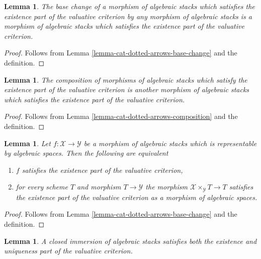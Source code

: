 \documentclass{stacks-project}
\theoremstyle{plain}
\newtheorem{lemma}[subsection]{Lemma}
\theoremstyle{definition}
\theoremstyle{remark}
\numberwithin{equation}{subsection}
\begin{document}
\begin{lemma}
\label{lemma-base-change-existence}
The base change of a morphism of algebraic stacks which satisfies the
existence part of the valuative criterion by any morphism of
algebraic stacks is a morphism of algebraic stacks which satisfies the
existence part of the valuative criterion.
\end{lemma}

\begin{proof}
Follows from Lemma \ref{lemma-cat-dotted-arrows-base-change}
and the definition.
\end{proof}

\begin{lemma}
\label{lemma-composition-existence}
The composition of morphisms of algebraic stacks which satisfy the
existence part of the valuative criterion is another
morphism of algebraic stacks which satisfies the
existence part of the valuative criterion.
\end{lemma}

\begin{proof}
Follows from Lemma \ref{lemma-cat-dotted-arrows-composition}
and the definition.
\end{proof}

\begin{lemma}
\label{lemma-existence-representable}
Let $f : \mathcal{X} \to \mathcal{Y}$ be a morphism of algebraic stacks
which is representable by algebraic spaces. Then the following are equivalent
\begin{enumerate}
\item $f$ satisfies the existence part of the valuative criterion,
\item for every scheme $T$ and morphism $T \to \mathcal{Y}$
the morphism $\mathcal{X} \times_\mathcal{Y} T \to T$ satisfies
the existence part of the valuative criterion as a morphism
of algebraic spaces.
\end{enumerate}
\end{lemma}

\begin{proof}
Follows from Lemma \ref{lemma-cat-dotted-arrows-base-change}
and the definition.
\end{proof}

\begin{lemma}
\label{lemma-closed-immersion-valuative-criteria}
A closed immersion of algebraic stacks satisfies both
the existence and uniqueness part of the valuative criterion.
\end{lemma}
\end{document}
